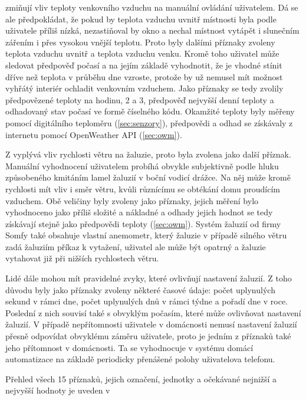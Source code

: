  zmiňují vliv teploty venkovního vzduchu na manuální ovládání uživatelem. Dá se ale předpokládat, že pokud by teplota vzduchu uvnitř místnosti byla podle uživatele příliš nízká, nezastiňoval by okno a nechal místnost vytápět i slunečním zářením i přes vysokou vnější teplotu. Proto byly dalšími příznaky zvoleny teplota vzduchu uvnitř a teplota vzduchu venku. Kromě toho uživatel může sledovat předpověď počasí a na jejím základě vyhodnotit, že je vhodné stínit dříve než teplota v průběhu dne vzroste, protože by už nemusel mít možnost vyhřátý interiér ochladit venkovním vzduchem. Jako příznaky se tedy zvolily předpovězené teploty na hodinu, 2 a 3, předpověď nejvyšší denní teploty a odhadovaný stav počasí ve formě číselného kódu. Okamžité teploty byly měřeny pomocí digitálního teploměru (\cref{sec:senzory}), předpovědi a odhad se získávaly z internetu pomocí OpenWeather API (\cref{sec:owm}).

Z  vyplývá vliv rychlosti větru na  žaluzie, proto byla zvolena jako další příznak. Manuální vyhodnocení uživatelem probíhá obvykle subjektivně podle hluku způsobeného kmitáním lamel žaluzií v boční vodicí drážce. Na něj může kromě rychlosti mít vliv i směr větru, kvůli různícímu se obtékání domu proudícím vzduchem. Obě veličiny byly zvoleny jako příznaky, jejich měření bylo vyhodnoceno jako příliš složité a nákladné a odhady jejich hodnot se tedy získávají stejně jako předpovědi teploty (\cref{sec:owm}). Systém žaluzií od firmy Somfy také obsahuje vlastní anemometr, který žaluzie v případě silného větru zadá žaluziím příkaz k vytažení, uživatel ale může být opatrný a žaluzie vytahovat již při nižších rychlostech větru.

Lidé dále mohou mít pravidelné zvyky, které ovlivňují nastavení žaluzií. Z toho důvodu byly jako příznaky zvoleny některé časové údaje: počet uplynulých sekund v rámci dne, počet uplynulých dnů v rámci týdne a pořadí dne v roce. Poslední z nich souvisí také s obvyklým počasím, které může ovlivňovat nastavení žaluzií. V případě nepřítomnosti uživatele v domácnosti nemusí nastavení žaluzií přesně odpovídat obvyklému záměru uživatele, proto je jedním z příznaků také jeho přítomnost v domácnosti. Ta se vyhodnocuje v systému domácí automatizace na základě periodicky přenášené polohy uživatelova telefonu.

Přehled všech 15 příznaků, jejich označení, jednotky a očekávané nejnižší a nejvyšší hodnoty je uveden v 
